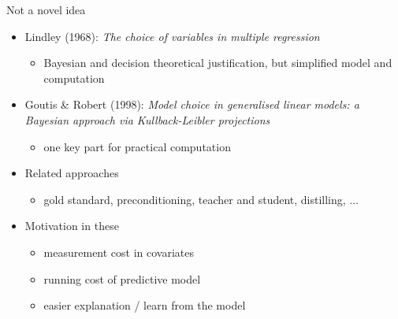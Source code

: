 \documentclass[t]{beamer}
\begin{document}
\begin{frame}{Not a novel idea}

  \begin{itemize}
  \item<+-> Lindley (1968): \textit{The choice of variables in multiple regression}
    \begin{itemize}
    \item Bayesian and decision theoretical justification, but
      simplified model and computation
    \end{itemize}
  \item<+-> Goutis \& Robert (1998): \textit{Model choice in generalised
      linear models: a Bayesian approach via Kullback-Leibler
      projections}
    \begin{itemize}
    \item one key part for practical computation
    \end{itemize}
  \item<+-> Related approaches
    \begin{itemize}
    \item gold standard,
     preconditioning,
     teacher and student,
     distilling,
     $\ldots$
    \end{itemize}
  \item<+-> Motivation in these
    \begin{itemize}
    \item measurement cost in covariates
    \item running cost of predictive model
    \item easier explanation / learn from the model
\end{itemize}
  \end{itemize}
  
\end{frame}
\end{document}
